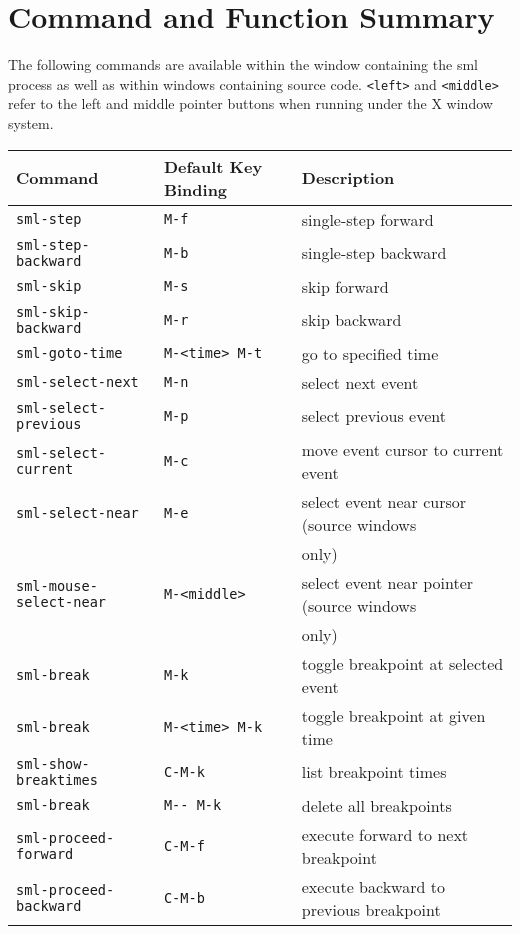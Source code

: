 \section{Command and Function Summary}
The following commands are available within the window containing the
sml process as well as within windows containing source code.
\verb'<left>' and \verb'<middle>' refer to the left and middle pointer
buttons when running under the X window system.

\begin{center}
\begin{tabular}{|lll|}    \hline
Command & Default Key Binding & Description \\ \hline
\verb'sml-step' & \verb'M-f'             & single-step forward\\
\verb'sml-step-backward' & \verb'M-b'           & single-step backward \\
\verb'sml-skip' & \verb'M-s'      & skip forward\\
\verb'sml-skip-backward' & \verb'M-r'  & skip backward\\
\verb'sml-goto-time' & \verb'M-<time> M-t'    & go to specified time \\
\verb'sml-select-next' & \verb'M-n'             & select next event \\
\verb'sml-select-previous' & \verb'M-p'             & select previous event \\
\verb'sml-select-current' & \verb'M-c'  & move event cursor to current event \\
\verb'sml-select-near' & \verb'M-e' &
	select event near cursor (source windows \\
    & & only) \\
\verb'sml-mouse-select-near' & \verb'M-<middle>' &
	select event near pointer (source windows \\
    & & only) \\
\verb'sml-break' & \verb'M-k' & toggle breakpoint at selected event \\
\verb'sml-break' & \verb'M-<time> M-k' & toggle breakpoint at given time \\
\verb'sml-show-breaktimes' & \verb'C-M-k'           & list breakpoint times \\
\verb'sml-break' & \verb'M-- M-k'         & delete all breakpoints \\
\verb'sml-proceed-forward' & \verb'C-M-f' 
	& execute forward to next breakpoint \\
\verb'sml-proceed-backward' & \verb'C-M-b' &
	execute backward to previous breakpoint \\

\end{tabular}
\end{center}
